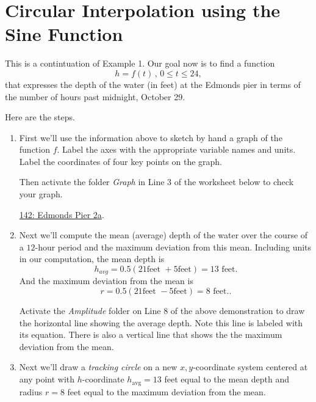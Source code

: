 \documentclass{ximera}
\begin{document}
\section{Circular Interpolation using the Sine Function}



\begin{example} \label{Efoe34r}
This is a contintuation of Example 1. Our goal now is to find a function
\[
     h = f(t) \, , \, 0\leq t \leq 24,
\]
that expresses the depth of the water (in feet) at the Edmonds pier in terms of the number of hours past midnight, October 29.

Here are the steps.

\begin{enumerate}

\item  First we'll use the information above to sketch by hand a graph of the function $f$. Label the axes with the appropriate variable names and units. Label the coordinates of four key points on the graph.

Then activate the folder \emph{Graph} in Line 3 of the worksheet below to check your graph.

\begin{onlineOnly}
    \begin{center}
\end{center}
\end{onlineOnly}

\href{https://www.desmos.com/calculator/jqmcce5as4}{142: Edmonds Pier 2a}.

\item Next we'll compute the mean (average) depth of the water over the course of a $12$-hour period and the maximum deviation from this mean. Including units in our computation, the mean depth is 
\[
    h_{avg} = 0.5 ( 21 \text{feet } + 5 \text{feet}) = 13 \text{ feet} . 
\]
And the maximum deviation from the mean is
\[
    r = 0.5 ( 21 \text{feet } - 5 \text{feet}) = 8 \text{ feet} ..
\]

Activate the \emph{Amplitude} folder on Line 8 of the above demonstration to draw the horizontal line showing the average depth. Note this line is labeled with its equation. There is also a vertical line that shows the the maximum deviation from the mean.

\item Next we'll draw a \emph{tracking circle} on a new $x,y$-coordinate system centered at any point with $h$-coordinate $h_{\text{avg}}=13$ feet equal to the mean depth and radius $r=8$ feet equal to the maximum deviation from the mean.


\end{enumerate}
\end{example}
\end{document}
